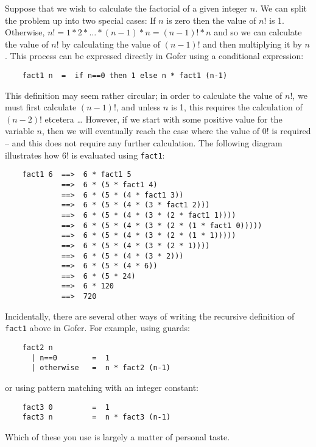 Suppose that we wish to calculate the factorial of a given  integer  $n$.
We can split the problem up into two special cases:
\BSI
\IT  If $n$ is zero then the value of $n!$ is 1.
\IT  Otherwise, $n!  = 1 * 2 * \dots * (n\!-\!1) * n = (n\!-\!1)! * n$  
     and  so  we
     can calculate the value of $n!$ by 
     calculating the value  of  $(n\!-\!1)!$
     and then multiplying it by $n$.
\ESI
This process can be expressed directly in  Gofer  using  a  conditional
expression:
\begin{verbatim}
    fact1 n  =  if n==0 then 1 else n * fact1 (n-1)
\end{verbatim}
This definition may seem rather circular; in  order  to  calculate  the
value of $n!$, we must first calculate $(n-1)!$, and unless $n$  is  1,  this
requires the calculation of $(n-2)!$ etcetera \dots
However, if  we  start  with
some positive value for the variable $n$, then we will  eventually  reach
the case where the value of $0!$ is required -- and this does not require
any further calculation.  The following diagram illustrates how  $6!$  is
evaluated using \verb"fact1":
\begin{verbatim}
    fact1 6  ==>  6 * fact1 5
             ==>  6 * (5 * fact1 4)
             ==>  6 * (5 * (4 * fact1 3))
             ==>  6 * (5 * (4 * (3 * fact1 2)))
             ==>  6 * (5 * (4 * (3 * (2 * fact1 1))))
             ==>  6 * (5 * (4 * (3 * (2 * (1 * fact1 0)))))
             ==>  6 * (5 * (4 * (3 * (2 * (1 * 1)))))
             ==>  6 * (5 * (4 * (3 * (2 * 1))))
             ==>  6 * (5 * (4 * (3 * 2)))
             ==>  6 * (5 * (4 * 6))
             ==>  6 * (5 * 24)
             ==>  6 * 120
             ==>  720
\end{verbatim}
Incidentally, there are several other ways  of  writing  the  recursive
definition of \verb"fact1" above in Gofer.  For example, using guards:
\begin{verbatim}
    fact2 n
      | n==0        =  1
      | otherwise   =  n * fact2 (n-1)
\end{verbatim}
or using pattern matching with an integer constant:
\begin{verbatim}
    fact3 0         =  1
    fact3 n         =  n * fact3 (n-1)
\end{verbatim}
Which of these you use is largely a matter of personal taste.

